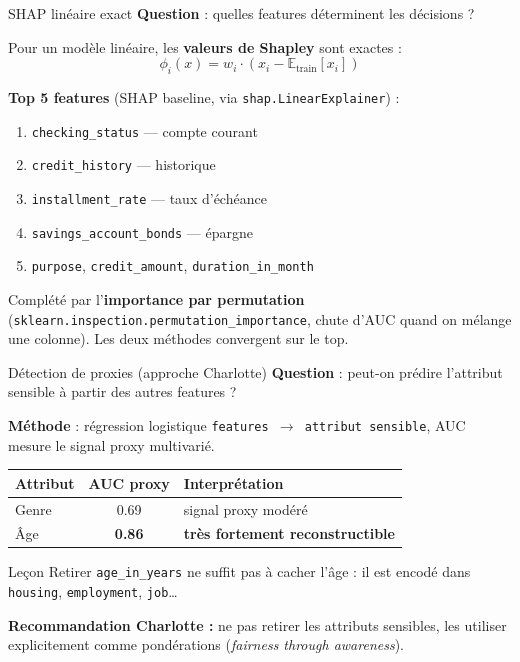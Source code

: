 \documentclass[aspectratio=169, 11pt]{beamer}
\begin{document}
\begin{frame}{SHAP lin\'eaire exact}
\textbf{Question} : quelles features d\'eterminent les d\'ecisions ?

\vspace{0.3em}
Pour un mod\`ele lin\'eaire, les \textbf{valeurs de Shapley} sont exactes :
$$\phi_i(x) = w_i \cdot \left(x_i - \mathbb{E}_{\text{train}}[x_i]\right)$$

\vspace{0.3em}
\textbf{Top 5 features} (SHAP baseline, via \texttt{shap.LinearExplainer}) :
\begin{enumerate}
    \item \texttt{checking\_status} --- compte courant
    \item \texttt{credit\_history} --- historique
    \item \texttt{installment\_rate} --- taux d'\'ech\'eance
    \item \texttt{savings\_account\_bonds} --- \'epargne
    \item \texttt{purpose}, \texttt{credit\_amount}, \texttt{duration\_in\_month}
\end{enumerate}

\vspace{0.3em}
Compl\'et\'e par l'\textbf{importance par permutation} (\texttt{sklearn.inspection.permutation\_importance}, chute d'AUC quand on m\'elange une colonne). Les deux m\'ethodes convergent sur le top.
\end{frame}

\begin{frame}{D\'etection de proxies (approche Charlotte)}
\textbf{Question} : peut-on pr\'edire l'attribut sensible \`a partir des autres features ?

\vspace{0.3em}
\textbf{M\'ethode} : r\'egression logistique \texttt{features $\to$ attribut sensible}, AUC mesure le signal proxy multivari\'e.

\vspace{0.3em}
\centering
\renewcommand{\arraystretch}{1.3}
\begin{tabular}{lcl}
\toprule
\textbf{Attribut} & \textbf{AUC proxy} & \textbf{Interpr\'etation} \\
\midrule
Genre & 0.69 & signal proxy mod\'er\'e \\
\^Age & \textcolor{alertc!80!black}{\textbf{0.86}} & \textcolor{alertc!80!black}{\textbf{tr\`es fortement reconstructible}} \\
\bottomrule
\end{tabular}

\vspace{0.5em}
\begin{alertblock}{Le\c{c}on}
Retirer \texttt{age\_in\_years} ne suffit pas \`a \og cacher \fg{} l'\^age : il est encod\'e dans \texttt{housing}, \texttt{employment}, \texttt{job}\ldots

\textbf{Recommandation Charlotte :} ne pas retirer les attributs sensibles, les utiliser explicitement comme pond\'erations (\textit{fairness through awareness}).
\end{alertblock}
\end{frame}
\end{document}
